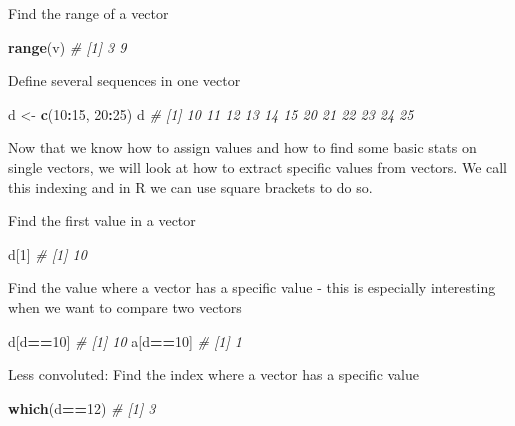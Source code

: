\documentclass[
]{book}
\newenvironment{Shaded}{\begin{snugshade}}{\end{snugshade}}
\newcommand{\CommentTok}[1]{\textcolor[rgb]{0.56,0.35,0.01}{\textit{#1}}}
\newcommand{\DecValTok}[1]{\textcolor[rgb]{0.00,0.00,0.81}{#1}}
\newcommand{\FunctionTok}[1]{\textcolor[rgb]{0.13,0.29,0.53}{\textbf{#1}}}
\newcommand{\NormalTok}[1]{#1}
\newcommand{\OtherTok}[1]{\textcolor[rgb]{0.56,0.35,0.01}{#1}}
\newcommand{\SpecialCharTok}[1]{\textcolor[rgb]{0.81,0.36,0.00}{\textbf{#1}}}
\begin{document}
Find the range of a vector

\begin{Shaded}
\begin{Highlighting}[]
\FunctionTok{range}\NormalTok{(v)}
\CommentTok{\# [1] 3 9}
\end{Highlighting}
\end{Shaded}

Define several sequences in one vector

\begin{Shaded}
\begin{Highlighting}[]
\NormalTok{d }\OtherTok{\textless{}{-}} \FunctionTok{c}\NormalTok{(}\DecValTok{10}\SpecialCharTok{:}\DecValTok{15}\NormalTok{, }\DecValTok{20}\SpecialCharTok{:}\DecValTok{25}\NormalTok{)}
\NormalTok{d}
\CommentTok{\#  [1] 10 11 12 13 14 15 20 21 22 23 24 25}
\end{Highlighting}
\end{Shaded}

Now that we know how to assign values and how to find some basic stats on single vectors, we will look at how to extract specific values from vectors.
We call this indexing and in R we can use square brackets to do so.

Find the first value in a vector

\begin{Shaded}
\begin{Highlighting}[]
\NormalTok{d[}\DecValTok{1}\NormalTok{]}
\CommentTok{\# [1] 10}
\end{Highlighting}
\end{Shaded}

Find the value where a vector has a specific value - this is especially interesting when we want to compare two vectors

\begin{Shaded}
\begin{Highlighting}[]
\NormalTok{d[d}\SpecialCharTok{==}\DecValTok{10}\NormalTok{]}
\CommentTok{\# [1] 10}
\NormalTok{a[d}\SpecialCharTok{==}\DecValTok{10}\NormalTok{]}
\CommentTok{\# [1] 1}
\end{Highlighting}
\end{Shaded}

Less convoluted: Find the index where a vector has a specific value

\begin{Shaded}
\begin{Highlighting}[]
\FunctionTok{which}\NormalTok{(d}\SpecialCharTok{==}\DecValTok{12}\NormalTok{)}
\CommentTok{\# [1] 3}
\end{Highlighting}
\end{Shaded}
\end{document}
